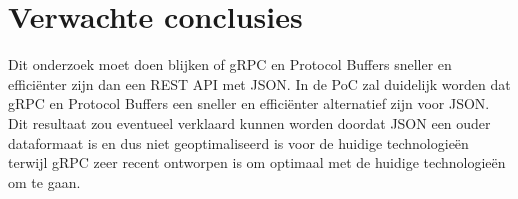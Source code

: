 



	



\section{Verwachte conclusies}
\label{sec:verwachte_conclusies}

Dit onderzoek moet doen blijken of gRPC en Protocol Buffers sneller en efficiënter zijn dan een REST API met JSON. In de PoC zal duidelijk worden dat gRPC en Protocol Buffers een sneller en efficiënter alternatief zijn voor JSON. Dit resultaat zou eventueel verklaard kunnen worden doordat JSON een ouder dataformaat is en dus niet geoptimaliseerd is voor de huidige technologieën terwijl gRPC zeer recent ontworpen is om optimaal met de huidige technologieën om te gaan.


